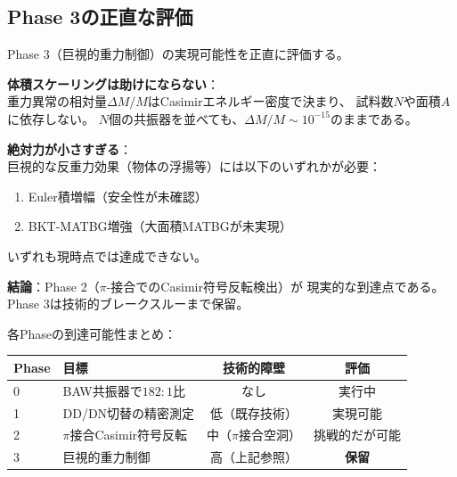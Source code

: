 \subsection{Phase 3の正直な評価}
\label{sec:14.5}

Phase 3（巨視的重力制御）の実現可能性を正直に評価する。

\begin{tcolorbox}[colback=red!5!white, colframe=red!75!black, title=Phase 3の現実的評価]
\textbf{体積スケーリングは助けにならない}：\\
重力異常の相対量$\Delta M/M$はCasimirエネルギー密度で決まり、
試料数$N$や面積$A$に依存しない。
$N$個の共振器を並べても、$\Delta M/M \sim 10^{-15}$のままである。

\vspace{0.5em}
\textbf{絶対力が小さすぎる}：\\
巨視的な反重力効果（物体の浮揚等）には以下のいずれかが必要：
\begin{enumerate}
\item Euler積増幅（安全性が未確認）
\item BKT-MATBG増強（大面積MATBGが未実現）
\end{enumerate}
いずれも現時点では達成できない。

\vspace{0.5em}
\textbf{結論}：Phase 2（$\pi$-接合でのCasimir符号反転検出）が
現実的な到達点である。Phase 3は技術的ブレークスルーまで保留。
\end{tcolorbox}

\noindent
各Phaseの到達可能性まとめ：

\begin{center}
\begin{tabular}{llcc}
\toprule
\textbf{Phase} & \textbf{目標} & \textbf{技術的障壁} & \textbf{評価} \\
\midrule
0 & BAW共振器で$182:1$比 & なし & 実行中 \\
1 & DD/DN切替の精密測定 & 低（既存技術） & 実現可能 \\
2 & $\pi$接合Casimir符号反転 & 中（$\pi$接合空洞） & 挑戦的だが可能 \\
3 & 巨視的重力制御 & 高（上記参照） & \textbf{保留} \\
\bottomrule
\end{tabular}
\end{center}



